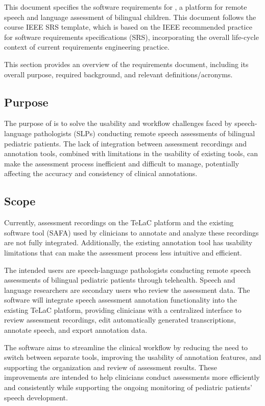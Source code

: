 \documentclass[12pt]{article}
\begin{document}
This document specifies the software requirements for \progname{}, a platform for remote speech and language assessment of bilingual children.
This document follows the course IEEE SRS template, which is based on the IEEE recommended practice for software requirements specifications (SRS), incorporating the overall life-cycle context
of current requirements engineering practice.

This section provides an overview of the requirements document, including its overall purpose, required background, and relevant definitions/acronyms.

\subsection{Purpose}

The purpose of \progname{} is to solve the usability and workflow challenges faced by speech-language pathologists (SLPs) conducting remote speech assessments of bilingual pediatric patients. The lack of integration between assessment recordings and annotation tools, combined with limitations in the usability of existing tools, can make the assessment process inefficient and difficult to manage, potentially affecting the accuracy and consistency of clinical annotations.

\subsection{Scope}

Currently, assessment recordings on the TeLaC platform and the existing software tool (SAFA) used by clinicians to annotate and analyze these recordings are not fully integrated. Additionally, the existing annotation tool has usability limitations that can make the assessment process less intuitive and efficient.

The intended users are speech-language pathologists conducting 
remote speech assessments of bilingual pediatric patients through 
telehealth. Speech and language researchers are secondary users who review the assessment data. The software will integrate speech assessment annotation 
functionality into the existing TeLaC platform, providing clinicians 
with a centralized interface to review assessment recordings, edit automatically generated transcriptions, annotate speech, and export annotation data.

The software aims to streamline the clinical workflow by reducing the need to switch between separate tools, improving the usability of annotation features, and supporting the organization and review of assessment results. These improvements are intended to help clinicians conduct assessments more efficiently and consistently while supporting the ongoing monitoring of pediatric patients' speech development.
\end{document}

